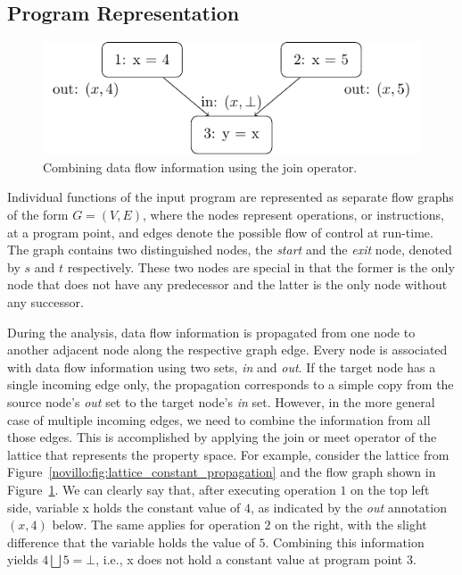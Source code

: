 \subsection{Program Representation}

\begin{figure}[b]
  \begin{center}
    \includegraphics{contr_flow_graph}
  \end{center}
  \vspace{-1em}
  \caption{Combining data flow information using the join operator.}
  \label{novillo:fig:control_flow_graph}
\end{figure}

Individual functions of the input program are represented as separate flow
graphs of the form $G = (V,E)$, where the nodes represent operations, or
instructions, at a program point, and edges denote the possible flow of control
at run-time. The graph contains two distinguished nodes, the \emph{start} and
the \emph{exit} node, denoted by $s$ and $t$ respectively. These two nodes are
special in that the former is the only node that does not have any predecessor
and the latter is the only node without any successor.

During the analysis, data flow information is propagated from one node to
another adjacent node along the respective graph edge. Every node is associated
with data flow information using two sets, \emph{in} and \emph{out}. If the
target node has a single incoming edge only, the propagation corresponds to a
simple copy from the source node's \emph{out} set to the target node's \emph{in}
set. However, in the more general case of multiple incoming edges, we need to
combine the information from all those edges. This is accomplished by applying
the join or meet operator of the lattice that represents the property space. For
example, consider the lattice from
Figure~\ref{novillo:fig:lattice_constant_propagation} and the flow graph shown
in Figure~\ref{novillo:fig:control_flow_graph}. We can clearly say that, after
executing operation $1$ on the top left side, variable x holds the
constant value of $4$, as indicated by the \emph{out} annotation $(x, 4)$ below.
The same applies for operation $2$ on the right, with the slight difference that
the variable holds the value of $5$. Combining this information yields $4
\bigsqcup 5 = \bot$, i.e., x does not hold a constant value at program point 3.

